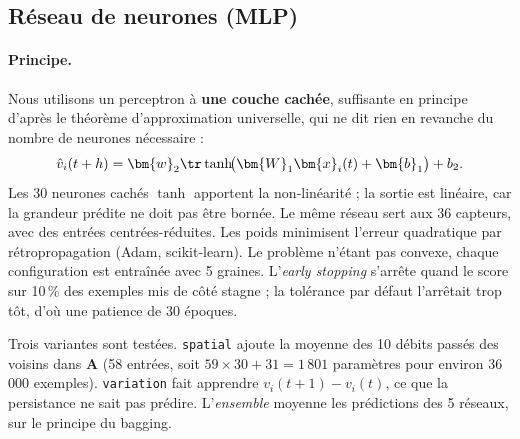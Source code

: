 \subsection{Réseau de neurones (MLP)}

\paragraph{Principe.}
Nous utilisons un perceptron à \textbf{une couche cachée}, suffisante en principe d'après le théorème
d'approximation universelle, qui ne dit rien en revanche du nombre de neurones nécessaire :
\begin{equation}
\hat{v}_i(t+h)=\bm{w}_2\tr\tanh\!\bigl(\bm{W}_1\bm{x}_i(t)+\bm{b}_1\bigr)+b_2 .
\end{equation}
Les 30 neurones cachés $\tanh$ apportent la non-linéarité ; la sortie est linéaire, car la grandeur prédite ne
doit pas être bornée. Le même réseau sert aux 36 capteurs, avec des entrées centrées-réduites. Les poids
minimisent l'erreur quadratique par rétropropagation (Adam, scikit-learn). Le problème n'étant pas convexe, chaque
configuration est entraînée avec 5 graines. L'\emph{early stopping} s'arrête quand le score sur 10\,\% des exemples
mis de côté stagne ; la tolérance par défaut l'arrêtait trop tôt, d'où une patience de 30 époques.

Trois variantes sont testées. \texttt{spatial} ajoute la moyenne des 10 débits passés des voisins dans $\bm{A}$
(58 entrées, soit $59\times30+31=1\,801$ paramètres pour environ 36\,000 exemples). \texttt{variation} fait
apprendre $v_i(t+1)-v_i(t)$, ce que la persistance ne sait pas prédire. L'\emph{ensemble} moyenne les
prédictions des 5 réseaux, sur le principe du bagging.

